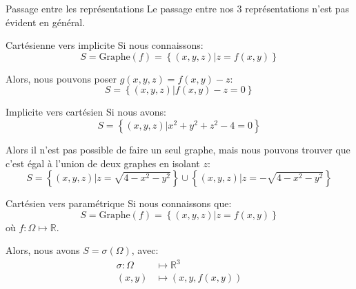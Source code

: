 \documentclass[a4paper]{article}
\begin{document}
\begin{parag}{Passage entre les représentations}
    Le passage entre nos 3 représentations n'est pas évident en général.

    \begin{subparag}{Cartésienne vers implicite}
        Si nous connaissons: 
        \[S = \text{Graphe}\left(f\right) = \left\{\left(x, y, z\right) | z = f\left(x, y\right)\right\}\]

        Alors, nous pouvons poser $g\left(x, y, z\right) = f\left(x, y\right) - z$: 
        \[S = \left\{\left(x, y, z\right) | f\left(x, y\right) - z = 0\right\}\]
    \end{subparag}

    \begin{subparag}{Implicite vers cartésien}
        Si nous avons: 
        \[S = \left\{\left(x, y, z\right) | x^2 + y^2 + z^2 - 4 = 0\right\}\]
        
        Alors il n'est pas possible de faire un seul graphe, mais nous pouvons trouver que c'est égal à l'union de deux graphes en isolant $z$: 
        \[S = \left\{\left(x, y, z\right) | z = \sqrt{4 - x^2 - y^2}\right\} \cup \left\{\left(x, y, z\right) | z = -\sqrt{4 - x^2- y^2}\right\}\]
    \end{subparag}
    
    \begin{subparag}{Cartésien vers paramétrique}
        Si nous connaissons que: 
        \[S = \text{Graphe}\left(f\right) = \left\{\left(x, y, z\right) | z = f\left(x, y\right)\right\}\]
        où $f: \Omega \mapsto \mathbb{R}$.

        Alors, nous avons $S = \sigma\left(\Omega\right)$, avec:
        \[\begin{split}
        \sigma: \Omega &\longmapsto \mathbb{R}^3 \\
        \left(x, y\right) &\longmapsto \left(x, y, f\left(x, y\right)\right)
        \end{split}\]
    \end{subparag}
\end{parag}
\end{document}

